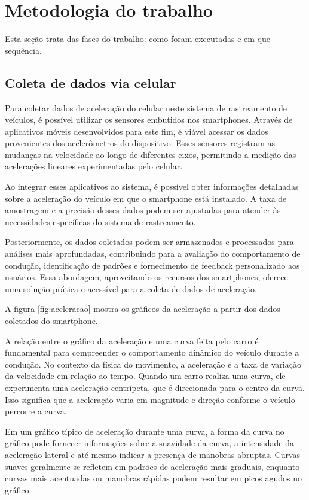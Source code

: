 \chapter{Metodologia do trabalho}
\label{CAP3}

Esta seção trata das fases do trabalho: como foram  executadas e em que sequência.



\section{Coleta de dados via celular}
Para coletar dados de aceleração do celular neste sistema de rastreamento de veículos, é possível utilizar os sensores embutidos nos smartphones. Através de aplicativos móveis desenvolvidos para este fim, é viável acessar os dados provenientes dos acelerômetros do dispositivo. Esses sensores registram as mudanças na velocidade ao longo de diferentes eixos, permitindo a medição das acelerações lineares experimentadas pelo celular. 

Ao integrar esses aplicativos ao sistema, é possível obter informações detalhadas sobre a aceleração do veículo em que o smartphone está instalado. A taxa de amostragem e a precisão desses dados podem ser ajustadas para atender às necessidades específicas do sistema de rastreamento. 

Posteriormente, os dados coletados podem ser armazenados e processados para análises mais aprofundadas, contribuindo para a avaliação do comportamento de condução, identificação de padrões e fornecimento de feedback personalizado aos usuários. Essa abordagem, aproveitando os recursos dos smartphones, oferece uma solução prática e acessível para a coleta de dados de aceleração.

A figura \ref{fig:aceleracao} mostra os gráficos da aceleração a partir dos dados coletados do smartphone. 

A relação entre o gráfico da aceleração e uma curva feita pelo carro é fundamental para compreender o comportamento dinâmico do veículo durante a condução. No contexto da física do movimento, a aceleração é a taxa de variação da velocidade em relação ao tempo. Quando um carro realiza uma curva, ele experimenta uma aceleração centrípeta, que é direcionada para o centro da curva. Isso significa que a aceleração varia em magnitude e direção conforme o veículo percorre a curva.

Em um gráfico típico de aceleração durante uma curva, a forma da curva no gráfico pode fornecer informações sobre a suavidade da curva, a intensidade da aceleração lateral e até mesmo indicar a presença de manobras abruptas. Curvas suaves geralmente se refletem em padrões de aceleração mais graduais, enquanto curvas mais acentuadas ou manobras rápidas podem resultar em picos agudos no gráfico.

